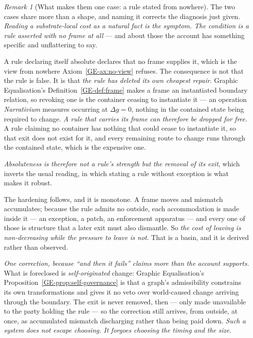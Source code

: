 \documentclass[11pt,a4paper]{article}
\theoremstyle{remark}
\newtheorem{remark}[definition]{Remark}
\begin{document}
\begin{remark}[What makes them one case: a rule stated from nowhere]\label{rem:nowhere}
The two cases share more than a shape, and naming it corrects the diagnosis just given. \emph{Reading a
substrate-local cost as a natural fact is the symptom. The condition is a rule asserted with no frame at
all} --- and about those the account has something specific and unflattering to say.

A rule declaring itself absolute declares that no frame supplies it, which is the view from nowhere
Axiom~\ref{GE-ax:no-view} refuses. The consequence is not that the rule is false. It is that \emph{the rule has deleted
its own cheapest repair}. Graphic Equalisation's Definition~\ref{GE-def:frame} makes a frame an
instantiated boundary relation, so revoking one is the container ceasing to instantiate it --- an
operation \emph{Narrativium} measures occurring at $\Delta g = 0$, nothing in the contained state being
required to change. \emph{A rule that carries its frame can therefore be dropped for free.} A rule
claiming no container has nothing that could cease to instantiate it, so that exit does not exist for
it, and every remaining route to change runs through the contained state, which is the expensive one.

\emph{Absoluteness is therefore not a rule's strength but the removal of its exit}, which inverts the
usual reading, in which stating a rule without exception is what makes it robust.

The hardening follows, and it is monotone. A frame moves and mismatch accumulates; because the rule
admits no outside, each accommodation is made inside it --- an exception, a patch, an enforcement
apparatus --- and every one of those is structure that a later exit must also dismantle. So \emph{the
cost of leaving is non-decreasing while the pressure to leave is not}. That is a basin, and it is
derived rather than observed.

\emph{One correction, because ``and then it fails'' claims more than the account supports.} What is
foreclosed is \emph{self-originated} change: Graphic Equalisation's
Proposition~\ref{GE-prop:self-governance} is that a graph's admissibility
constrains its own transformations and gives it no veto over world-caused change arriving through the
boundary. The exit is never removed, then --- only made unavailable to the party holding the rule --- so
the correction still arrives, from outside, at once, as accumulated mismatch discharging rather than
being paid down. \emph{Such a system does not escape choosing. It forgoes choosing the timing and the
size.}


\end{remark}
\end{document}
